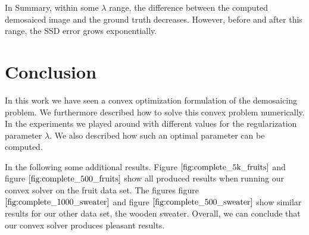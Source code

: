 \documentclass{paper}
\begin{document}
In Summary, within some $\lambda$ range, the difference between the computed demosaiced image and the ground truth decreases. However, before and after this range, the SSD error grows exponentially.

\section{Conclusion}
In this work we have seen a convex optimization formulation of the demosaicing problem. We furthermore described how to solve this convex problem numerically. In the experiments we played around with different values for the regularization parameter $\lambda$. We also described how such an optimal parameter can be computed. 

In the following some additional results. Figure $\ref{fig:complete_5k_fruits}$ and figure $\ref{fig:complete_500_fruits}$ show all produced results when running our convex solver on the fruit data set. The figures figure $\ref{fig:complete_1000_sweater}$ and figure $\ref{fig:complete_500_sweater}$ show similar results for our other data set, the wooden sweater. Overall, we can conclude that our convex solver produces pleasant results.
\end{document}
